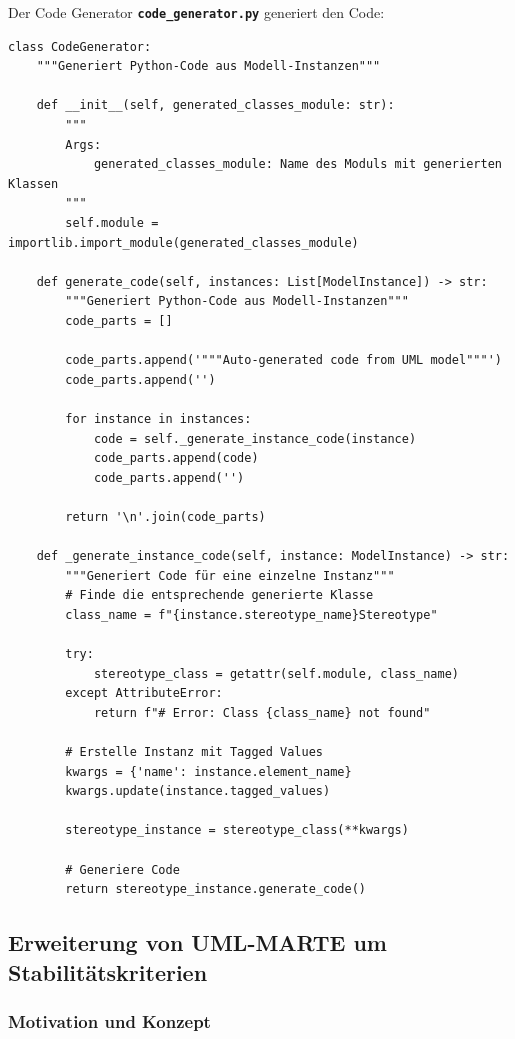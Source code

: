 ﻿\documentclass[a4paper,12pt]{scrreprt}
\theoremstyle{definition}
\begin{document}
Der Code Generator \texttt{\textbf{code\_generator.py}} generiert den Code:
\begin{lstlisting}[style=python, caption={ProfileParser Implementierung}, label={lst:profile-parser}]
class CodeGenerator:
    """Generiert Python-Code aus Modell-Instanzen"""
    
    def __init__(self, generated_classes_module: str):
        """
        Args:
            generated_classes_module: Name des Moduls mit generierten Klassen
        """
        self.module = importlib.import_module(generated_classes_module)
    
    def generate_code(self, instances: List[ModelInstance]) -> str:
        """Generiert Python-Code aus Modell-Instanzen"""
        code_parts = []
        
        code_parts.append('"""Auto-generated code from UML model"""')
        code_parts.append('')
        
        for instance in instances:
            code = self._generate_instance_code(instance)
            code_parts.append(code)
            code_parts.append('')
        
        return '\n'.join(code_parts)
    
    def _generate_instance_code(self, instance: ModelInstance) -> str:
        """Generiert Code für eine einzelne Instanz"""
        # Finde die entsprechende generierte Klasse
        class_name = f"{instance.stereotype_name}Stereotype"
        
        try:
            stereotype_class = getattr(self.module, class_name)
        except AttributeError:
            return f"# Error: Class {class_name} not found"
        
        # Erstelle Instanz mit Tagged Values
        kwargs = {'name': instance.element_name}
        kwargs.update(instance.tagged_values)
        
        stereotype_instance = stereotype_class(**kwargs)
        
        # Generiere Code
        return stereotype_instance.generate_code()
\end{lstlisting}

\subsection{Erweiterung von UML-MARTE um Stabilitätskriterien}
\label{sec:marte-stability}

\subsubsection{Motivation und Konzept}
\end{document}
